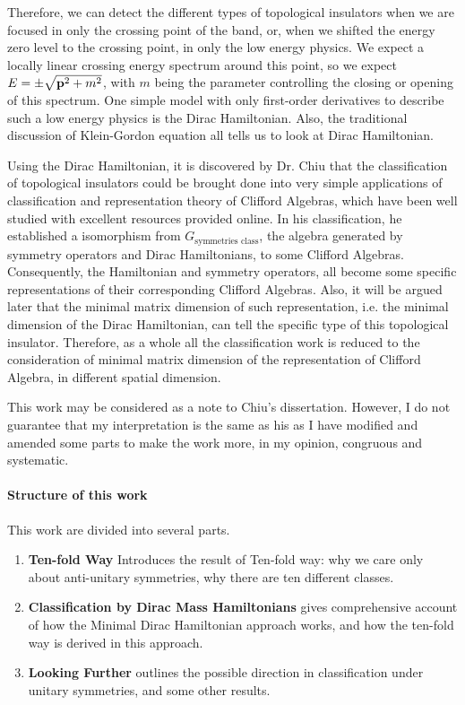 Therefore, we can detect the different types of topological insulators when we
are focused in only the crossing point of the band, or, when we shifted the
energy zero level to the crossing point, in only the low energy physics. We
expect a locally linear crossing energy spectrum around this point, so we expect
$E=\pm\sqrt{\vb{p}^2+m^2}$, with $m$ being the parameter controlling the closing or
opening of this spectrum. One simple model with only first-order derivatives to
describe such a low energy physics is the Dirac Hamiltonian. Also, the
traditional discussion of Klein-Gordon equation all tells us to look at Dirac
Hamiltonian.

Using the Dirac Hamiltonian, it is discovered by Dr. Chiu \cite{Chiu2013a} that
the classification of topological insulators could be brought done into very
simple applications of classification and representation theory of Clifford
Algebras, which have been well studied with excellent resources provided online.
In his classification, he established a isomorphism from $G_{\text{symmetries 
class}}$, the algebra generated by symmetry operators and Dirac Hamiltonians, to
some Clifford Algebras. Consequently, the Hamiltonian and symmetry operators,
all become some specific representations of their corresponding Clifford
Algebras. Also, it will be argued later that the minimal matrix dimension of
such representation, i.e. the minimal dimension of the Dirac Hamiltonian, can
tell the specific type of this topological insulator. Therefore, as a whole all
the classification work is reduced to the consideration of minimal matrix
dimension of the representation of Clifford Algebra, in different spatial
dimension.

This work may be considered as a note to Chiu's dissertation\cite{Chiu2013a}.
However, I do not guarantee that my interpretation is the same as his as I have
modified and amended some parts to make the work more, in my opinion, congruous
and systematic.

\paragraph{Structure of this work} This work are divided into several parts.
\begin{enumerate}
    \item \textbf{Ten-fold Way} Introduces the result of Ten-fold way: why we
        care only about anti-unitary symmetries, why there are ten different
        classes.
    \item \textbf{Classification by Dirac Mass Hamiltonians} gives comprehensive
        account of how the Minimal Dirac Hamiltonian approach works, and how the
        ten-fold way is derived in this approach.
    \item \textbf{Looking Further} outlines the possible direction in classification
        under unitary symmetries, and some other results.
\end{enumerate}
